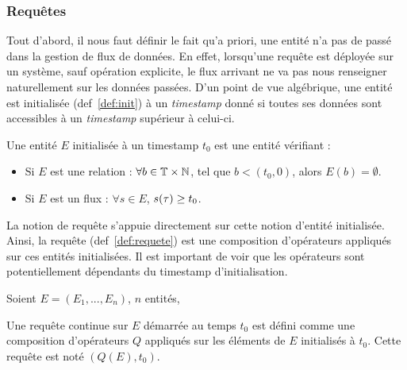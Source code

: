 \subsubsection{Requêtes}
Tout d'abord, il nous faut définir le fait qu'a priori, une entité n'a pas de passé dans la gestion de flux de données. En effet, lorsqu'une requête est déployée sur un système, sauf opération explicite, le flux arrivant ne va pas nous renseigner naturellement sur les données passées. D'un point de vue algébrique, une entité est initialisée (def~\ref{def:init}) à un \textit{timestamp} donné si toutes ses données sont accessibles à un \textit{timestamp} supérieur à celui-ci.
\begin{defi}\label{def:init}
	Une entité $E$ initialisée à un timestamp $t_0$ est une entité vérifiant :
	\begin{itemize}
		\item Si $E$ est une relation : $\forall b \in \mathbb{T}\times\mathbb{N}$, tel que $b<(t_0,0)$, alors $E(b) = \emptyset$.
		\item Si $E$ est un flux : $\forall s\in E$, $s(\tau) \geq t_0$.
	\end{itemize}
\end{defi}

La notion de requête s'appuie directement sur cette notion d'entité initialisée. Ainsi, la requête (def~\ref{def:requete}) est une composition d'opérateurs appliqués sur ces entités initialisées. Il est important de voir que les opérateurs sont potentiellement dépendants du timestamp d'initialisation.
\begin{defi}[Requête]\label{def:requete}
	Soient $E=(E_1, ..., E_n)$, $n$ entités,
	
	Une requête continue sur $E$ démarrée au temps $t_0$ est défini comme une composition d'opérateurs $Q$ appliqués sur les éléments de $E$ initialisés à $t_0$. Cette requête est noté $(Q(E),t_0)$.
\end{defi}

